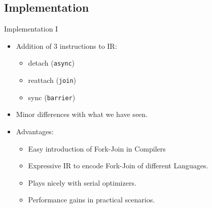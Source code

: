 \documentclass{beamer}
\begin{document}
\subsection{Implementation}
\begin{frame}{Implementation I}
    \begin{itemize}
        \item Addition of 3 instructions to IR:
        \begin{itemize}
            \item detach (\texttt{async})
            \item reattach (\texttt{join})
            \item sync      (\texttt{barrier})
        \end{itemize}
        \item Minor differences with what we have seen.
        \item Advantages:
        \begin{itemize}
            \item Easy introduction of Fork-Join in Compilers
            \item Expressive IR to encode Fork-Join of different Languages.
            \item Plays nicely with serial optimizers.
            \item Performance gains in practical scenarios.
        \end{itemize}
    \end{itemize}
\end{frame}
\end{document}
